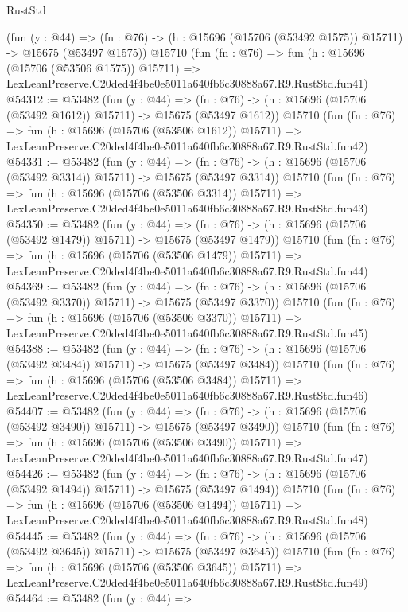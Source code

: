 \begin{lexlean}{RustStd}
\begin{coremodule}
    (fun (y : @44) =>
    (fn : @76) -> (h : @15696 (@15706 (@53492 @1575)) @15711) -> @15675 (@53497 @1575))
    @15710
    (fun (fn : @76) =>
    fun (h : @15696 (@15706 (@53506 @1575)) @15711) =>
    LexLeanPreserve.C20ded4f4be0e5011a640fb6c30888a67.R9.RustStd.fun41)
@54312 := @53482
    (fun (y : @44) =>
    (fn : @76) -> (h : @15696 (@15706 (@53492 @1612)) @15711) -> @15675 (@53497 @1612))
    @15710
    (fun (fn : @76) =>
    fun (h : @15696 (@15706 (@53506 @1612)) @15711) =>
    LexLeanPreserve.C20ded4f4be0e5011a640fb6c30888a67.R9.RustStd.fun42)
@54331 := @53482
    (fun (y : @44) =>
    (fn : @76) -> (h : @15696 (@15706 (@53492 @3314)) @15711) -> @15675 (@53497 @3314))
    @15710
    (fun (fn : @76) =>
    fun (h : @15696 (@15706 (@53506 @3314)) @15711) =>
    LexLeanPreserve.C20ded4f4be0e5011a640fb6c30888a67.R9.RustStd.fun43)
@54350 := @53482
    (fun (y : @44) =>
    (fn : @76) -> (h : @15696 (@15706 (@53492 @1479)) @15711) -> @15675 (@53497 @1479))
    @15710
    (fun (fn : @76) =>
    fun (h : @15696 (@15706 (@53506 @1479)) @15711) =>
    LexLeanPreserve.C20ded4f4be0e5011a640fb6c30888a67.R9.RustStd.fun44)
@54369 := @53482
    (fun (y : @44) =>
    (fn : @76) -> (h : @15696 (@15706 (@53492 @3370)) @15711) -> @15675 (@53497 @3370))
    @15710
    (fun (fn : @76) =>
    fun (h : @15696 (@15706 (@53506 @3370)) @15711) =>
    LexLeanPreserve.C20ded4f4be0e5011a640fb6c30888a67.R9.RustStd.fun45)
@54388 := @53482
    (fun (y : @44) =>
    (fn : @76) -> (h : @15696 (@15706 (@53492 @3484)) @15711) -> @15675 (@53497 @3484))
    @15710
    (fun (fn : @76) =>
    fun (h : @15696 (@15706 (@53506 @3484)) @15711) =>
    LexLeanPreserve.C20ded4f4be0e5011a640fb6c30888a67.R9.RustStd.fun46)
@54407 := @53482
    (fun (y : @44) =>
    (fn : @76) -> (h : @15696 (@15706 (@53492 @3490)) @15711) -> @15675 (@53497 @3490))
    @15710
    (fun (fn : @76) =>
    fun (h : @15696 (@15706 (@53506 @3490)) @15711) =>
    LexLeanPreserve.C20ded4f4be0e5011a640fb6c30888a67.R9.RustStd.fun47)
@54426 := @53482
    (fun (y : @44) =>
    (fn : @76) -> (h : @15696 (@15706 (@53492 @1494)) @15711) -> @15675 (@53497 @1494))
    @15710
    (fun (fn : @76) =>
    fun (h : @15696 (@15706 (@53506 @1494)) @15711) =>
    LexLeanPreserve.C20ded4f4be0e5011a640fb6c30888a67.R9.RustStd.fun48)
@54445 := @53482
    (fun (y : @44) =>
    (fn : @76) -> (h : @15696 (@15706 (@53492 @3645)) @15711) -> @15675 (@53497 @3645))
    @15710
    (fun (fn : @76) =>
    fun (h : @15696 (@15706 (@53506 @3645)) @15711) =>
    LexLeanPreserve.C20ded4f4be0e5011a640fb6c30888a67.R9.RustStd.fun49)
@54464 := @53482
    (fun (y : @44) =>

\end{coremodule}
\end{lexlean}
